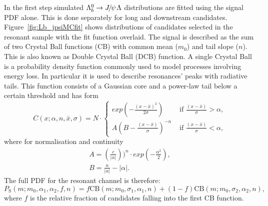 In the first step simulated $\Lb\to\jpsi\Lz$ distributions are fitted using the signal PDF alone.
This is done separately for long and downstream candidates. Figure~\ref{fig:Lb_jpsiMCfit} shows 
distributions of candidates selected in the resonant sample with the fit function overlaid.
%
The signal is described as the sum of two Crystal Ball functions (CB) with
common mean ($m_0$) and tail slope ($n$). This is also known as Double Crystal Ball (DCB) function.
A single Crystal Ball~\cite{Skwarnicki:1986xj} is a probability
density function commonly used to model processes involving energy loss. In particular it is used
to describe resonances' peaks with radiative tails. This function 
consists of a Gaussian core and a power-law tail below a certain threshold and has form
%
\begin{equation}
C(x;\alpha,n,\bar{x},\sigma) = N \cdot
\begin{cases}
exp \left( -\frac{(x - \bar{x})^2}{2\sigma} \right)  & \mbox{   if   } \frac{(x - \bar{x})}{\sigma} > \alpha, \\
A\left( B - \frac{(x - \bar{x})}{\sigma} \right)^{-n} & \mbox{   if   } \frac{(x - \bar{x})}{\sigma} < \alpha,
\end{cases}
\end{equation}
%
where for normalisation and continuity
%
\begin{equation}
\label{CB}
\begin{array}{ll}
A = \left( \frac{c}{|\alpha|} \right))^n \cdot exp(- \frac{\alpha^2}{2}), \\
B = \frac{n}{|\alpha|} - |\alpha|.
\end{array}
\end{equation}
%
The full PDF for the resonant channel is therefore:
%
\begin{equation}
P_\mathrm{S}(m;m_0,\alpha_1,\alpha_2,f,n) = f \text{CB}(m;m_0,\sigma_1,\alpha_1,n)+(1-f)\text{CB}(m;m_0,\sigma_2,\alpha_2,n),
\end{equation}
%
where $f$ is the relative fraction of candidates falling into the first CB function.

